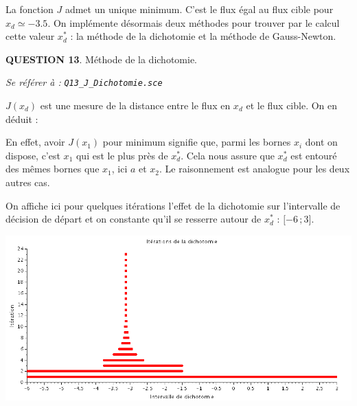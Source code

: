 \documentclass[a4paper,11pt]{article}
\newcommand{\quest}[1]{\small\textbf{#1}\normalsize}
\theoremstyle{nonumberplain}
\theoremstyle{nonumberplain}
\theoremstyle{nonumberplain}
\begin{document}
    La fonction $J$ admet un unique minimum. C'est le flux égal au flux
    cible pour $x_d \simeq -3.5$. On implémente désormais deux méthodes pour
    trouver par le calcul cette valeur $x_d^{*}$ : la méthode de la dichotomie
    et la méthode de Gauss-Newton.\newline

    \bigskip
    \quest{QUESTION 13}. Méthode de la dichotomie.
    \begin{ref_scilab}
        \emph{Se référer à :} \texttt{\emph{Q13\_J\_Dichotomie.sce}}
    \end{ref_scilab}

    $J(x_d)$ est une mesure de la distance entre le flux en $x_d$ et le flux cible. On en déduit :

    \medskip
    \begin{algorithm}[H]
    \end{algorithm}

    \newpage En effet, avoir $J(x_1)$ pour minimum signifie que, parmi les bornes $x_i$
    dont on dispose, c'est $x_1$ qui est le plus près de $x_d^{*}$. Cela nous assure que
    $x_d^{*}$ est entouré des mêmes bornes que $x_1$, ici $a$ et $x_2$. Le raisonnement
    est analogue pour les deux autres cas.\newline

    On affiche ici pour quelques itérations l'effet de la dichotomie sur l'intervalle
    de décision de départ et on constante qu'il se resserre
    autour de $x_d^{*}$ : $\mathopen{[}-6\,;3\mathclose{]}$.

    \begin{center}
        \includegraphics[scale=0.52]{images/q13_dichotomie.png}
    \end{center}
\end{document}
